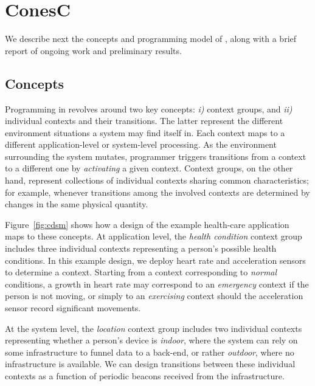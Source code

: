 \section{ConesC}
We describe next the concepts and programming model of \conesc, along
with a brief report of ongoing work and preliminary results.

\subsection{Concepts}

Programming in \conesc revolves around two key concepts: \emph{i)}
context groups, and \emph{ii)} individual contexts and their
transitions. The latter represent the different environment situations
a system may find itself in. Each context maps to a different
application-level or system-level processing. As the environment
surrounding the system mutates, programmer triggers transitions from a
context to a different one by \emph{activating} a given
context. Context groups, on the other hand, represent collections of
individual contexts sharing common characteristics; for example,
whenever transitions among the involved contexts are determined by
changes in the same physical quantity.



Figure~\ref{fig:cdsm} shows how a design of the example health-care
application maps to these concepts. At application level, the
\emph{health condition} context group includes three individual
contexts representing a person's possible health conditions. In this
example design, we deploy heart rate and acceleration sensors to
determine a context. Starting from a context corresponding to \emph{normal}
conditions, a growth in heart rate may correspond to an
\emph{emergency} context if the person is not moving, or simply to an
\emph{exercising} context should the acceleration sensor record significant
movements.

At the system level, the \emph{location} context group
includes two individual contexts representing whether a person's
device is \emph{indoor}, where the system can rely on some
infrastructure to funnel data to a back-end, or rather \emph{outdoor},
where no infrastructure is available. We can design transitions
between these individual contexts as a function of periodic beacons
received from the infrastructure.

